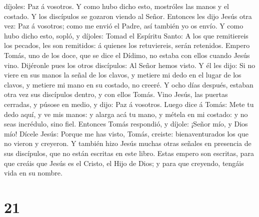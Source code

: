 díjoles: Paz á vosotros.  Y como hubo dicho esto, mostróles
las manos y el costado. Y los discípulos se gozaron viendo al Señor.
 Entonces les dijo Jesús otra vez: Paz á vosotros; como me
envió el Padre, así también yo os envío.  Y como hubo dicho
esto, sopló, y díjoles: Tomad el Espíritu Santo:  A los que
remitiereis los pecados, les son remitidos: á quienes los retuviereis,
serán retenidos.  Empero Tomás, uno de los doce, que se
dice el Dídimo, no estaba con ellos cuando Jesús vino. 
Dijéronle pues los otros discípulos: Al Señor hemos visto. Y él les
dijo: Si no viere en sus manos la señal de los clavos, y metiere mi dedo
en el lugar de los clavos, y metiere mi mano en su costado, no creeré.
 Y ocho días después, estaban otra vez sus discípulos
dentro, y con ellos Tomás. Vino Jesús, las puertas cerradas, y púsose en
medio, y dijo: Paz á vosotros.  Luego dice á Tomás: Mete tu
dedo aquí, y ve mis manos: y alarga acá tu mano, y métela en mi costado:
y no seas incrédulo, sino fiel.  Entonces Tomás respondió,
y díjole: ¡Señor mío, y Dios mío!  Dícele Jesús: Porque me
has visto, Tomás, creiste: bienaventurados los que no vieron y creyeron.
 Y también hizo Jesús muchas otras señales en presencia de
sus discípulos, que no están escritas en este libro.  Estas
empero son escritas, para que creáis que Jesús es el Cristo, el Hijo de
Dios; y para que creyendo, tengáis vida en su nombre.

\hypertarget{section-20}{%
\section{21}\label{section-20}}

